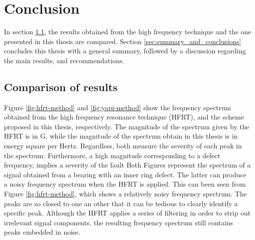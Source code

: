 \documentclass[../Main/thesis.tex]{subfiles}
\begin{document}
	\chapter[Conclusions]{Conclusion}
	\label{sec:conclusions}
	 In section \ref{sec:comp}, the results obtained from the high frequency technique and the one presented in this thesis are compared.
	 Section \ref{sec:summary_and_conclusions} concludes this thesis with a general summary, followed by a discussion regarding the main results, and recommendations.

	
	\section{Comparison of results}
		\label{sec:comp}
	Figure \ref{fig:hfrt-method} and \ref{fig:yapi-method} show the frequency spectrum obtained from the high frequency resonance technique (HFRT), and the scheme proposed in this thesis, respectively. The magnitude of the spectrum given by the HFRT is in G, while the magnitude of the spectrum obtain in this thesis is in energy square per Hertz. Regardless, both measure the severity of each peak in the spectrum. Furthermore, a high magnitude corresponding to a defect frequency, implies a severity of the fault
	\justify
	 Both Figures represent the spectrum of a signal obtained from a bearing with an inner ring defect. The latter can produce a noisy frequency spectrum when the HFRT is applied. This can been seen from Figure \ref{fig:hfrt-method}, which shows a relatively noisy frequency spectrum. The peaks are so closed to one an other that it can be tedious to clearly identify a specific peak.
	Although the HFRT applies a series of filtering in order to strip out irrelevant signal components, the resulting frequency spectrum still contains  peaks embedded in noise.
	
\end{document}
